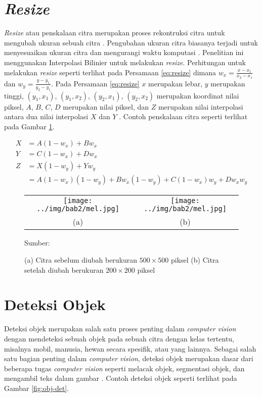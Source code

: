\section{\textit{Resize}}
\textit{Resize} atau penskalaan citra merupakan proses rekontruksi citra untuk mengubah ukuran sebuah citra \citep{Morsy2018}. Pengubahan ukuran citra biasanya terjadi untuk menyesuaikan ukuran citra dan mengurangi waktu komputasi \citep{AhmedThaajwer2020a,Umamaheswari2018}. Penelitian ini menggunakan Interpolasi Bilinier untuk melakukan \textit{resize}. Perhitungan untuk melakukan \textit{resize} seperti terlihat pada Persamaan \ref{eq:resize} dimana $w_x = \frac{x-x_1}{x_2-x_1}$ dan $w_y = \frac{y-y_1}{y_2-y_1}$. Pada Persamaan \ref{eq:resize} $x$ merupakan lebar, $y$ merupakan tinggi, $(y_1, x_1)$, $(y_1, x_2)$, $(y_2, x_1)$, $(y_2, x_2)$ merupakan koordinat nilai piksel, $A$, $B$, $C$, $D$ merupakan nilai piksel, dan $Z$ merupakan nilai interpolasi antara dua nilai interpolasi $X$ dan $Y$ \citep{Gribbon2004}. Contoh penskalaan citra seperti terlihat pada Gambar \ref{fig:resize}.

\begin{align}
    X &= A(1-w_x)+Bw_x\nonumber\\
    Y &= C(1-w_x)+Dw_x\nonumber\\
    Z &= X(1-w_y)+Yw_y\nonumber\\
    \label{eq:resize}
    &= A(1-w_x)(1-w_y) + Bw_x(1-w_y) + C(1-w_x)w_y + Dw_{x}w_{y}
\end{align}

\begin{figure}[H]
    \centering
    \begin{tabular}{cc}
        \texttt{[image: ../img/bab2/mel.jpg]}
        &
        \texttt{[image: ../img/bab2/mel.jpg]}\\
        (a) &(b)\\
    \end{tabular}
    \caption{(a) Citra sebelum diubah berukuran $500\times 500$ piksel (b) Citra setelah diubah berukuran $200\times 200$ piksel}
    \label{fig:resize}
    Sumber: \citep{Morsy2018}
\end{figure}

\section{Deteksi Objek}
Deteksi objek merupakan salah satu proses penting dalam \textit{computer vision} dengan mendeteksi sebuah objek pada sebuah citra dengan kelas tertentu, misalnya mobil, manusia, hewan secara spesifik, atau yang lainnya. Sebagai salah satu bagian penting dalam \textit{computer vision}, deteksi objek merupakan dasar dari beberapa tugas \textit{computer vision} seperti melacak objek, segmentasi objek, dan mengambil teks dalam gambar \citep{Zou2019}. Contoh deteksi objek seperti terlihat pada Gambar \ref{fig:obj-det}.

